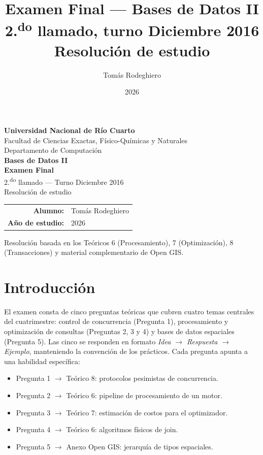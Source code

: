 \documentclass[11pt,a4paper]{article}
\title{Examen Final --- Bases de Datos II\\[4pt]
       \large 2.\textsuperscript{do} llamado, turno Diciembre 2016\\[4pt]
       \large Resolución de estudio}
\author{Tomás Rodeghiero}
\date{2026}
\begin{document}
\begin{titlepage}
    \centering
    \vspace*{1.5cm}

    {\large \textbf{Universidad Nacional de Río Cuarto}}\\[6pt]
    {\normalsize Facultad de Ciencias Exactas, Físico-Químicas y Naturales}\\[4pt]
    {\normalsize Departamento de Computación}\\[3cm]

    {\Large \textbf{Bases de Datos II}}\\[1.2cm]

    {\Large \textbf{Examen Final}}\\[6pt]
    {\large 2.\textsuperscript{do} llamado --- Turno Diciembre 2016}\\[6pt]
    {\large Resolución de estudio}\\[3cm]

    \begin{tabular}{rl}
        \textbf{Alumno:} & Tomás Rodeghiero \\[4pt]
        \textbf{Año de estudio:} & 2026 \\
    \end{tabular}

    \vfill
    {\small Resolución basada en los Teóricos 6 (Procesamiento), 7 (Optimización), 8 (Transacciones) y material complementario de Open GIS.}
\end{titlepage}

\tableofcontents
\newpage

\section{Introducción}

El examen consta de cinco preguntas teóricas que cubren cuatro temas centrales del cuatrimestre: control de concurrencia (Pregunta 1), procesamiento y optimización de consultas (Preguntas 2, 3 y 4) y bases de datos espaciales (Pregunta 5). Las cinco se responden en formato \emph{Idea $\to$ Respuesta $\to$ Ejemplo}, manteniendo la convención de los prácticos. Cada pregunta apunta a una habilidad específica:

\begin{itemize}
    \item Pregunta 1 $\to$ Teórico 8: protocolos pesimistas de concurrencia.
    \item Pregunta 2 $\to$ Teórico 6: pipeline de procesamiento de un motor.
    \item Pregunta 3 $\to$ Teórico 7: estimación de costos para el optimizador.
    \item Pregunta 4 $\to$ Teórico 6: algoritmos físicos de join.
    \item Pregunta 5 $\to$ Anexo Open GIS: jerarquía de tipos espaciales.
\end{itemize}
\end{document}
